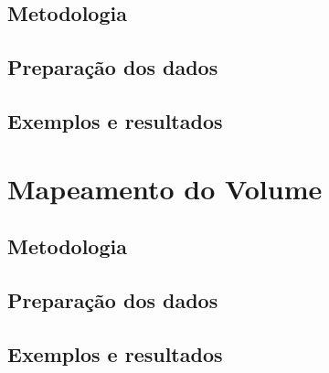 \subsection{Metodologia}

\subsection{Preparação dos dados}

\subsection{Exemplos e resultados}

\section{Mapeamento do Volume}

\subsection{Metodologia}

\subsection{Preparação dos dados}

\subsection{Exemplos e resultados}



